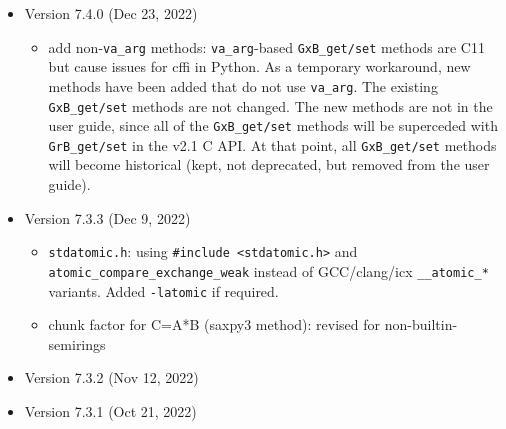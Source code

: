 \documentclass[12pt]{article}
\newenvironment{packed_itemize}{
\begin{itemize}
  \setlength{\itemsep}{1pt}
  \setlength{\parskip}{0pt}
  \setlength{\parsep}{0pt}
}{\end{itemize}}
\begin{document}
\begin{itemize}
\item Version 7.4.0 (Dec 23, 2022)

    \begin{itemize}
    \item add non-\verb'va_arg' methods: \verb'va_arg'-based \verb'GxB_get/set'
        methods are C11 but cause issues for cffi in Python.  As a
        temporary workaround, new methods have been added that do not use
        \verb'va_arg'.  The existing \verb'GxB_get/set' methods are not
        changed.  The new methods are not in the user guide, since all of the
        \verb'GxB_get/set' methods will be superceded with \verb'GrB_get/set'
        in the v2.1 C API.  At that point, all \verb'GxB_get/set' methods will
        become historical (kept, not deprecated, but removed from the user
        guide).
    \end{itemize}

\item Version 7.3.3 (Dec 9, 2022)

    \begin{itemize}
    \item \verb'stdatomic.h': using \verb'#include <stdatomic.h>' and
        \newline
        \verb'atomic_compare_exchange_weak'
        instead of GCC/clang/icx \verb'__atomic_*' variants.
        Added \verb'-latomic' if required.
    \item chunk factor for C=A*B (saxpy3 method):
        revised for non-builtin-semirings
    \end{itemize}

\item Version 7.3.2 (Nov 12, 2022)


\item Version 7.3.1 (Oct 21, 2022)



\end{itemize}
\end{document}
